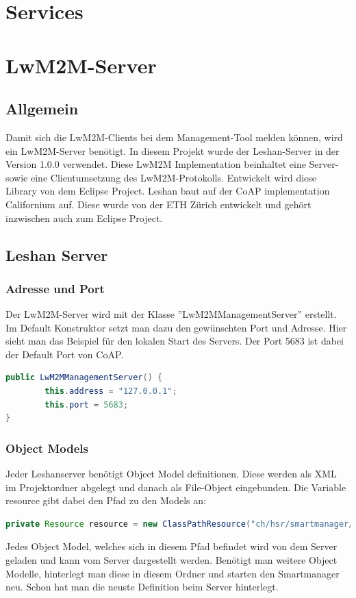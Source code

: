 \newpage

\section{Services}



\newpage

\section{LwM2M-Server}
\subsection{Allgemein}
Damit sich die LwM2M-Clients bei dem Management-Tool melden können, wird ein LwM2M-Server benötigt. In diesem Projekt wurde der Leshan-Server in der Version 1.0.0 verwendet. Diese LwM2M Implementation beinhaltet eine Server- sowie eine Clientumsetzung des LwM2M-Protokolls. Entwickelt wird diese Library von dem Eclipse Project. Leshan baut auf der CoAP implementation Californium auf. Diese wurde von der ETH Zürich entwickelt und  gehört inzwischen auch zum Eclipse Project.

\subsection{Leshan Server}
\subsubsection{Adresse und Port}
Der LwM2M-Server wird mit der Klasse ''LwM2MManagementServer'' erstellt. Im Default Konstruktor setzt man dazu den gewünschten Port und Adresse.
Hier sieht man das Beispiel für den lokalen Start des Servers. Der Port 5683 ist dabei der Default Port von CoAP.
\begin{lstlisting}[language=java]
public LwM2MManagementServer() {
		this.address = "127.0.0.1";
		this.port = 5683;
}
\end{lstlisting}
\subsubsection{Object Models}
Jeder Leshanserver benötigt Object Model definitionen. Diese werden als XML im Projektordner abgelegt und danach als File-Object eingebunden.
Die Variable resource gibt dabei den Pfad zu den Models an:
\begin{lstlisting}[language=java]
private Resource resource = new ClassPathResource("ch/hsr/smartmanager/resources/models/");
\end{lstlisting}
Jedes Object Model, welches sich in diesem Pfad befindet wird von dem Server geladen und kann vom Server dargestellt werden. Benötigt man weitere Object Modelle, hinterlegt man diese in diesem Ordner und starten den Smartmanager neu. Schon hat man die neuste Definition beim Server hinterlegt.
